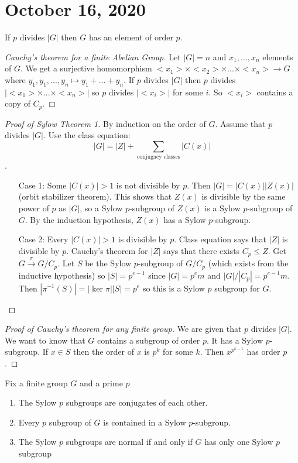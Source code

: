 \documentclass{article}
\newcommand{\ra}[1][]{\xrightarrow{#1}}
\begin{document}
\section{October 16, 2020}
\begin{theorem}
If $p$ divides $|G|$ then $G$ has an element of order $p$. 
\end{theorem}
\begin{proof}[Cauchy's theorem for a finite Abelian Group]
Let $|G|=n$ and $x_1,...,x_n$ elements of $G$. We get a surjective homomorphism $<x_1>\times <x_2>\times...\times<x_n>\ra G$ where $y_1,y_1,...,y_n\mapsto y_1+...+y_n$. If $p$ divides $|G|$ then $p$ divides $|<x_1>\times...\times <x_n>|$ so $p$ divides $|<x_i>|$ for some $i$. So $<x_i>$ contains a copy of $C_p$. 
\end{proof}
\begin{proof}[Proof of Sylow Theorem 1]
By induction on the order of $G$.
Assume that $p$ divides $|G|$. Use the class equation: $$|G|=|Z|+\sum_{\textrm{conjugacy classes}} |C(x)|$$.
\begin{enumerate}
    \item[Case 1:] Some $|C(x)|>1$ is not divisible by $p$. Then $|G|=|C(x)||Z(x)|$ (orbit stabilizer theorem). This shows that $Z(x)$ is divisible by the same power of $p$ as $|G|$, so a Sylow $p$-subgroup of $Z(x)$ is a Sylow $p$-subgroup of $G$. By the induction hypothesis, $Z(x)$ has a Sylow $p$-subgroup.
    \item[Case 2:] Every $|C(x)|>1$ is divisible by $p$. Class equation says that $|Z|$ is divisible by $p$. Cauchy's theorem for $|Z|$ says that there exists $C_p\leq Z$. Get $G\ra[\pi]G/C_p$. Let $S$ be the Sylow $p$-subgroup of $G/C_p$ (which exists from the inductive hypothesis) so $|S|=p^{e-1}$ since $|G|=p^em$ and $|G|/|C_p|=p^{e-1}m$. Then $|\pi^{-1}(S)|=|\ker\pi||S|=p^e$ so this is a Sylow $p$ subgroup for $G$.
\end{enumerate}
\end{proof}
\begin{proof}[Proof of Cauchy's theorem for any finite group]
We are given that $p$ divides $|G|$. We want to know that $G$ contains a subgroup of order $p$. It has a Sylow $p$-subgroup. If $x\in S$ then the order of $x$ is $p^k$ for some $k$. Then $x^{p^{k-1}}$ has order $p$.
\end{proof}
\begin{theorem}
Fix a finite group $G$ and a prime $p$
\begin{enumerate}
    \item The Sylow $p$ subgroups are conjugates of each other.
    \item Every $p$ subgroup of $G$ is contained in a Sylow $p$-subgroup.
    \item The Sylow $p$ subgroups are normal if and only if $G$ has only one Sylow $p$ subgroup
\end{enumerate}
\end{theorem}
\end{document}
